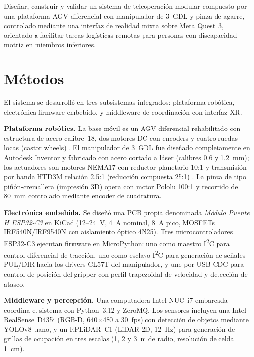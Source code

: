 \documentclass[12pt,letterpaper]{article}
\begin{document}
Diseñar, construir y validar un sistema de teleoperación modular compuesto por una
plataforma AGV diferencial con manipulador de 3~GDL y pinza de agarre, controlado
mediante una interfaz de realidad mixta sobre Meta Quest~3, orientado a facilitar
tareas logísticas remotas para personas con discapacidad motriz en miembros inferiores.

\section{Métodos}

El sistema se desarrolló en tres subsistemas integrados: plataforma robótica,
electrónica-firmware embebido, y middleware de coordinación con interfaz XR.

\textbf{Plataforma robótica.}
La base móvil es un AGV diferencial rehabilitado con estructura de acero calibre~18,
dos motores DC con encoders y cuatro ruedas locas (castor wheels) \cite{siegwart2011}.
El manipulador de 3~GDL fue diseñado completamente en Autodesk Inventor y fabricado
con acero cortado a láser (calibres 0.6 y 1.2~mm); los actuadores son motores NEMA17
con reductor planetario 10:1 y transmisión por banda HTD3M relación 2.5:1 (reducción
compuesta 25:1) \cite{siciliano2010}. La pinza de tipo piñón-cremallera (impresión 3D)
opera con motor Pololu 100:1 y recorrido de \SI{80}{mm} controlado mediante encoder de
cuadratura.

\textbf{Electrónica embebida.}
Se diseñó una PCB propia denominada \textit{Módulo Puente H ESP32-C3} en KiCad
(12--24~V, 4~A nominal, 8~A pico, MOSFETs IRF540N/IRF9540N con aislamiento óptico 4N25).
Tres microcontroladores ESP32-C3 ejecutan firmware en MicroPython: uno como maestro I\textsuperscript{2}C
para control diferencial de tracción, uno como esclavo I\textsuperscript{2}C para
generación de señales PUL/DIR hacia los drivers CL57T del manipulador, y uno por
USB-CDC para control de posición del gripper con perfil trapezoidal de velocidad y
detección de atasco.

\textbf{Middleware y percepción.}
Una computadora Intel NUC~i7 embarcada coordina el sistema con Python~3.12 y ZeroMQ.
Los sensores incluyen una Intel RealSense~D435i (RGB-D, 640$\times$480 a 30~fps) con
detección de objetos mediante YOLOv8~nano, y un RPLiDAR~C1 (LiDAR 2D, 12~Hz) para
generación de grillas de ocupación en tres escalas (1, 2 y 3~m de radio, resolución
de celda 1~cm).
\end{document}
